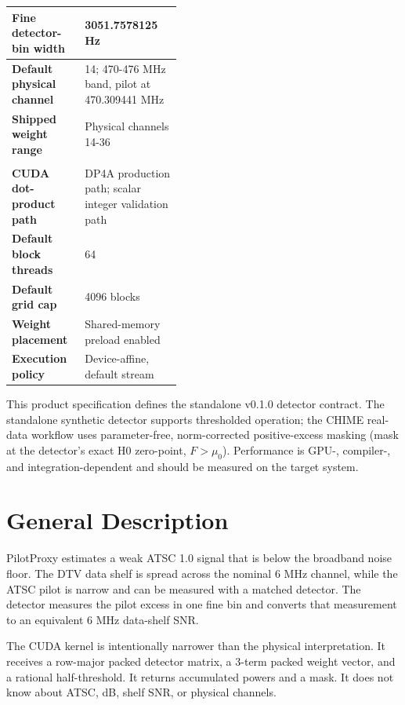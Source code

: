 \documentclass[10pt,letterpaper]{article}
\begin{document}
\begin{minipage}[t]{0.48\textwidth}
\begin{tabularx}{\linewidth}{|>{\bfseries}L{0.43\linewidth}|Y|}
Fine detector-bin width & 3051.7578125 Hz \\ \hline
Default physical channel & 14; 470-476 MHz band, pilot at 470.309441 MHz \\ \hline
Shipped weight range & Physical channels 14-36 \\ \hline
{}\\ \hline
CUDA dot-product path & DP4A production path; scalar integer validation path \\ \hline
Default block threads & 64 \\ \hline
Default grid cap & 4096 blocks \\ \hline
Weight placement & Shared-memory preload enabled \\ \hline
Execution policy & Device-affine, default stream \\ \hline
\end{tabularx}
\end{minipage}

\vfill
{\small\color{FStatGray}This product specification defines the standalone v0.1.0 detector contract.  The standalone synthetic detector supports thresholded operation; the CHIME real-data workflow uses parameter-free, norm-corrected positive-excess masking (mask at the detector's exact H0 zero-point, $F>\mu_0$).  Performance is GPU-, compiler-, and integration-dependent and should be measured on the target system.}

\newpage
\tableofcontents
\newpage

\section{General Description}

PilotProxy estimates a weak ATSC 1.0 signal that is below the broadband noise floor.  The DTV data shelf is spread across the nominal 6 MHz channel, while the ATSC pilot is narrow and can be measured with a matched detector.  The detector measures the pilot excess in one fine bin and converts that measurement to an equivalent 6 MHz data-shelf SNR.

The CUDA kernel is intentionally narrower than the physical interpretation.  It receives a row-major packed detector matrix, a 3-term packed weight vector, and a rational half-threshold.  It returns accumulated powers and a mask.  It does not know about ATSC, dB, shelf SNR, or physical channels.
\end{document}
